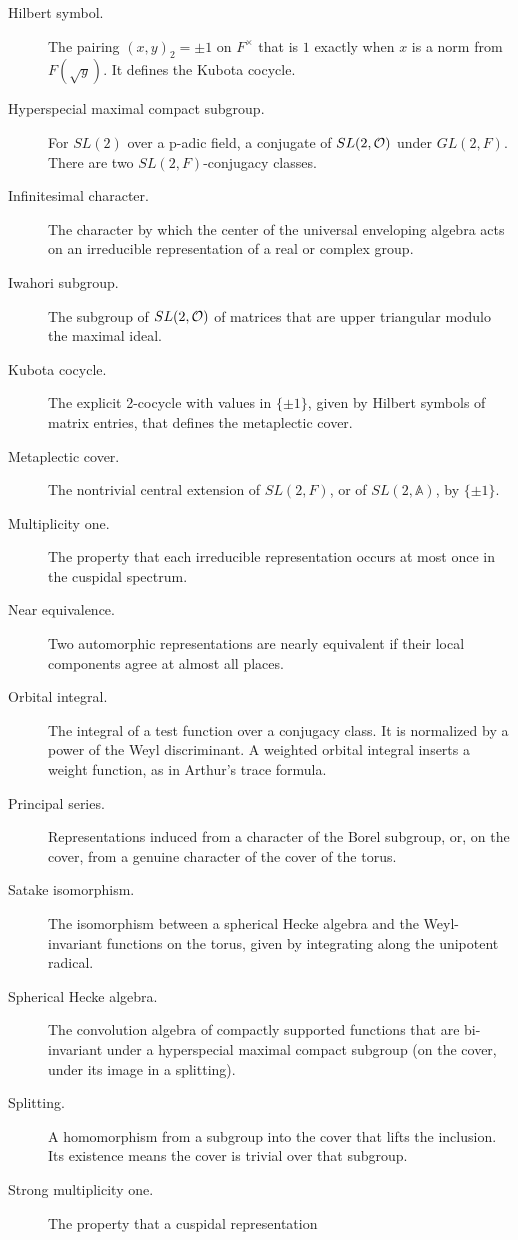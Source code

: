 \documentclass[12pt,letterpaper,openany]{book}
\theoremstyle{plain}
\theoremstyle{definition}
\theoremstyle{remark}
\theoremstyle{remark}
\begin{document}
\begin{description}
\item[Hilbert symbol.] The pairing $(x,y)_2=\pm1$ on $F^\times$ that is $1$
exactly when $x$ is a norm from $F(\sqrt y)$. It defines the Kubota
cocycle.
\item[Hyperspecial maximal compact subgroup.] For $SL(2)$ over a p-adic
field, a conjugate of $SL(2,{\cal O})$ under $GL(2,F)$. There are two
$SL(2,F)$-conjugacy classes.
\item[Infinitesimal character.] The character by which the center of the
universal enveloping algebra acts on an irreducible representation of a
real or complex group.
\item[Iwahori subgroup.] The subgroup of $SL(2,{\cal O})$ of matrices that are
upper triangular modulo the maximal ideal.
\item[Kubota cocycle.] The explicit 2-cocycle with values in $\{\pm1\}$,
given by Hilbert symbols of matrix entries, that defines the metaplectic
cover.
\item[Metaplectic cover.] The nontrivial central extension of $SL(2,F)$, or
of $SL(2,{\mathbb A})$, by $\{\pm1\}$.
\item[Multiplicity one.] The property that each irreducible representation
occurs at most once in the cuspidal spectrum.
\item[Near equivalence.] Two automorphic representations are nearly
equivalent if their local components agree at almost all places.
\item[Orbital integral.] The integral of a test function over a conjugacy
class. It is normalized by a power of the Weyl discriminant. A weighted
orbital integral inserts a weight function, as in Arthur's trace formula.
\item[Principal series.] Representations induced from a character of the
Borel subgroup, or, on the cover, from a genuine character of the cover of
the torus.
\item[Satake isomorphism.] The isomorphism between a spherical Hecke
algebra and the Weyl-invariant functions on the torus, given by integrating
along the unipotent radical.
\item[Spherical Hecke algebra.] The convolution algebra of compactly
supported functions that are bi-invariant under a hyperspecial maximal
compact subgroup (on the cover, under its image in a splitting).
\item[Splitting.] A homomorphism from a subgroup into the cover that lifts
the inclusion. Its existence means the cover is trivial over that subgroup.
\item[Strong multiplicity one.] The property that a cuspidal representation

\end{description}
\end{document}
